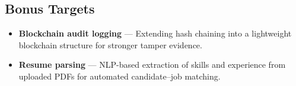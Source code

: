 \subsection{Bonus Targets}

\begin{itemize}
    \item \textbf{Blockchain audit logging} — Extending hash chaining into a lightweight blockchain structure for stronger tamper evidence.
    \item \textbf{Resume parsing} — NLP-based extraction of skills and experience from uploaded PDFs for automated candidate--job matching.
\end{itemize}
